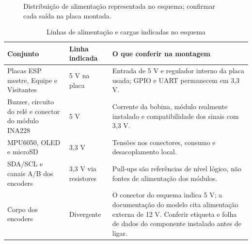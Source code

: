 \begin{figure}[htbp]\centering
{}
\caption{Distribuição de alimentação representada no esquema; confirmar cada saída na placa montada.}\label{fig:alimentacao}
\end{figure}

\begin{table}[htbp]\centering\small
\caption{Linhas de alimentação e cargas indicadas no esquema}\label{tab:alimentacao-modulos}
\begin{tabularx}{\textwidth}{@{}p{3.6cm}p{2.0cm}X@{}}\toprule
Conjunto & Linha indicada & O que conferir na montagem\\\midrule
Placas ESP mestre, Equipe e Visitantes & 5 V na placa & Entrada de 5 V e regulador interno da placa usada; GPIO e UART permanecem em 3,3 V.\\
Buzzer, circuito do relé e conector do módulo INA228 & 5 V & Corrente da bobina, módulo realmente instalado e compatibilidade dos sinais com 3,3 V.\\
MPU6050, OLED e microSD & 3,3 V & Tensões nos conectores, consumo e desacoplamento local.\\
SDA/SCL e canais A/B dos encoders & 3,3 V via resistores & Pull-ups são referências de nível lógico, não fontes de alimentação dos módulos.\\
Corpo dos encoders & Divergente & O conector do esquema indica 5 V; a documentação do modelo cita alimentação externa de 12 V. Conferir etiqueta e folha de dados do componente instalado antes de ligar.\\\bottomrule
\end{tabularx}\end{table}

